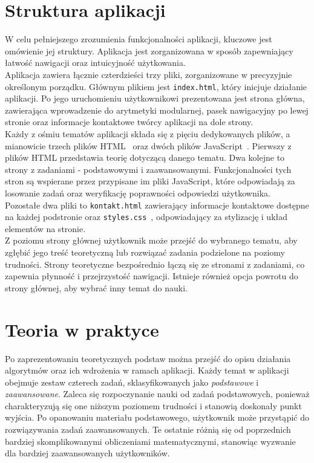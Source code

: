 \documentclass{SGGW-thesis}
\begin{document}
	\chapter{Struktura aplikacji}
	W celu pełniejszego zrozumienia funkcjonalności aplikacji, kluczowe jest omówienie jej struktury. Aplikacja jest zorganizowana w sposób zapewniający łatwość nawigacji oraz intuicyjność użytkowania.
	\\
	Aplikacja zawiera łącznie czterdzieści trzy pliki, zorganizowane w precyzyjnie określonym porządku. Głównym plikiem jest \texttt{index.html}, który inicjuje działanie aplikacji. Po jego uruchomieniu użytkownikowi prezentowana jest strona główna, zawierająca wprowadzenie do arytmetyki modularnej, pasek nawigacyjny po lewej stronie oraz informacje kontaktowe twórcy aplikacji na dole strony.
	\\
	Każdy z ośmiu tematów aplikacji składa się z pięciu dedykowanych plików, a mianowicie trzech plików HTML~\cite{html} oraz dwóch plików JavaScript~\cite{js}. Pierwszy z plików HTML przedstawia teorię dotyczącą danego tematu. Dwa kolejne to strony z zadaniami - podstawowymi i zaawansowanymi. Funkcjonalności tych stron są wspierane przez przypisane im pliki JavaScript, które odpowiadają za losowanie zadań oraz weryfikację poprawności odpowiedzi użytkownika. 
	\\
	Pozostałe dwa pliki to \texttt{kontakt.html} zawierający informacje kontaktowe dostępne na każdej podstronie oraz \texttt{styles.css}~\cite{css}, odpowiadający za stylizację i układ elementów na stronie.
	\\
	Z poziomu strony głównej użytkownik może przejść do wybranego tematu, aby zgłębić jego treść teoretyczną lub rozwiązać zadania podzielone na poziomy trudności. Strony teoretyczne bezpośrednio łączą się ze stronami z zadaniami, co zapewnia płynność i przejrzystość nawigacji. Istnieje również opcja powrotu do strony głównej, aby wybrać inny temat do nauki.
	\newpage
	
	\chapter{Teoria w praktyce}
	Po zaprezentowaniu teoretycznych podstaw można przejść do opisu działania algorytmów oraz ich wdrożenia w ramach aplikacji. Każdy temat w aplikacji obejmuje zestaw czterech zadań, sklasyfikowanych jako \textit{podstawowe} i \textit{zaawansowane}. Zaleca się rozpoczynanie nauki od zadań podstawowych, ponieważ charakteryzują się one niższym poziomem trudności i stanowią doskonały punkt wyjścia. Po opanowaniu materiału podstawowego, użytkownik może przystąpić do rozwiązywania zadań zaawansowanych. Te ostatnie różnią się od poprzednich bardziej skomplikowanymi obliczeniami matematycznymi, stanowiąc wyzwanie dla bardziej zaawansowanych użytkowników.
	
\end{document}
